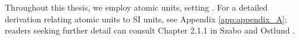 \documentclass{subfiles}
\begin{document}
Throughout this thesis, we employ atomic units, setting . For a detailed derivation relating atomic units to SI units, see Appendix \ref{app:appendix_A}; readers seeking further detail can consult Chapter 2.1.1 in Szabo and Ostlund \cite{szabo1996modern}.


\newpage





\end{document}
